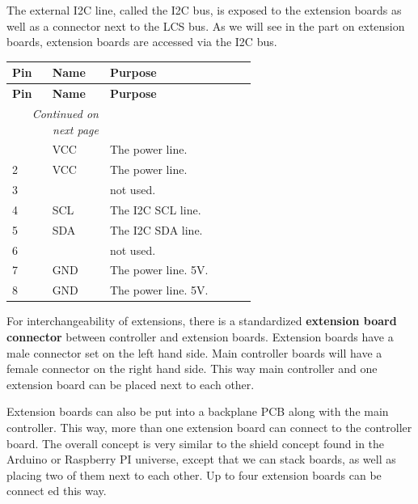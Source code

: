 
The external I2C line, called the I2C bus, is exposed to the extension boards as well as a connector next to the LCS bus. As we will see in the part on extension boards, extension boards are accessed via the I2C bus. 

\begin{longtable}{@{}|l|l|p{0.6\linewidth}|@{}}
    \toprule
    \textbf{Pin} & \textbf{Name} & \textbf{Purpose} \\
    \midrule
    \endfirsthead
    \toprule
    \textbf{Pin} & \textbf{Name} & \textbf{Purpose} \\
    \midrule
    \endhead
    \midrule
    \multicolumn{2}{r}{\textit{Continued on next page}} \\
    \midrule
    \endfoot
    \bottomrule
    \endlastfoot
    1 & VCC & The power line. \\
    \midrule
    2 & VCC & The power line. \\
    \midrule
    3 &  & not used. \\
    \midrule
    4 & SCL & The I2C SCL line. \\
    \midrule
    5 & SDA & The I2C SDA line. \\
    \midrule
    6 &  & not used. \\
    \midrule
    7 & GND & The power line. 5V. \\
    \midrule
    8 & GND & The power line. 5V. \\  
\end{longtable}


For interchangeability of extensions, there is a standardized \textbf{extension board connector} between controller and extension boards. Extension boards have a male connector set on the left hand side. Main controller boards will have a female connector on the right hand side. This way main controller and one extension board can be placed next to each other. 

Extension boards can also be put into a backplane PCB along with the main controller. This way, more than one extension board can connect to the controller board. The overall concept is very similar to the shield concept found in the Arduino or Raspberry PI universe, except that we can stack boards, as well as placing two of them next to each other. Up to four extension boards can be connect ed this way.

